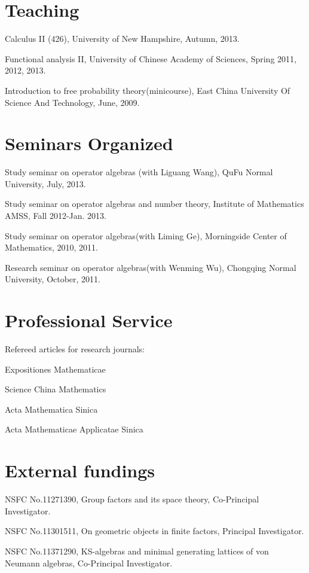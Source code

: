 \documentclass[letterpaper]{article}
\renewenvironment{itemize}{
  \begin{list}{}{
    \setlength{\leftmargin}{1.5em}
  }
}{
  \end{list}
}
\begin{document}
\section*{Teaching}
\begin{itemize}
    \item Calculus II (426), University of New Hampshire, Autumn, 2013.
	\item Functional analysis II, University of Chinese Academy of Sciences, Spring
	2011, 2012, 2013.
	\item Introduction to free probability theory(minicourse), East China
	University Of Science And Technology, June, 2009.
\end{itemize}


\section*{Seminars Organized}
\begin{itemize}
  \item Study seminar on operator algebras (with Liguang Wang), QuFu Normal University, July, 2013.
  \item Study seminar on operator algebras and number theory, Institute of
  Mathematics AMSS, Fall 2012-Jan. 2013.
  \item Study seminar on operator algebras(with Liming Ge), Morningside Center
  of Mathematics, 2010, 2011.
  \item Research seminar on operator algebras(with Wenming Wu), Chongqing Normal
  University, October, 2011.
\end{itemize}

\section*{Professional Service}
Refereed articles for research journals:
\begin{itemize}
  \item Expositiones Mathematicae 
  \item Science China Mathematics 
  \item Acta Mathematica Sinica 
  \item Acta Mathematicae Applicatae Sinica
\end{itemize}

\section*{External fundings}
\begin{itemize}
    \item NSFC  
        No.11271390, Group factors and its space theory, 
        Co-Principal Investigator.
    \item NSFC
        No.11301511, On geometric objects in finite factors, 
        Principal Investigator.
    \item NSFC
        No.11371290, KS-algebras and minimal generating 
        lattices of von Neumann algebras, 
        Co-Principal Investigator.
\end{itemize}
\end{document}
